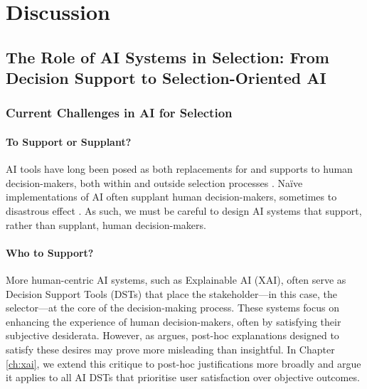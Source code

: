 \chapter{\label{ch:discussion}Discussion}

\minitoc 

\section[The Role of AI Systems in Selection]{The Role of AI Systems in Selection: From Decision Support to Selection-Oriented AI}
\subsection{Current Challenges in AI for Selection}
\subsubsection{To Support or Supplant?}
AI tools have long been posed as both replacements for and supports to human decision-makers, both within and outside selection processes \cite{barocas_big_2016,jacobs_how_2021,hildebrandt_law_nodate,yarger2020algorithmic,mattu_how_nodate}. Naïve implementations of AI often supplant human decision-makers, sometimes to disastrous effect \cite{mattu_how_nodate}. As such, we must be careful to design AI systems that support, rather than supplant, human decision-makers.

\subsubsection{Who to Support?}
More human-centric AI systems, such as Explainable AI (XAI), often serve as Decision Support Tools (DSTs) that place the stakeholder—in this case, the selector—at the core of the decision-making process. These systems focus on enhancing the experience of human decision-makers, often by satisfying their subjective desiderata. However, as \textcite{Lipton} argues, post-hoc explanations designed to satisfy these desires may prove more misleading than insightful. In Chapter \ref{ch:xai}, we extend this critique to post-hoc justifications more broadly and argue it applies to all AI DSTs that prioritise user satisfaction over objective outcomes.


